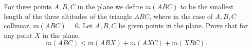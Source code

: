 For three points $A, B, C$ in the plane we define $m(ABC)$ to be the smallest length of the three altitudes of the triangle $ABC$, where in the case of $A, B, C$ collinear, $m(ABC) = 0$. Let $A, B, C$ be given points in the plane. Prove that for any point $X$ in the plane,
\[ m(ABC) \leq m(ABX) + m(AXC) + m(XBC). \]
